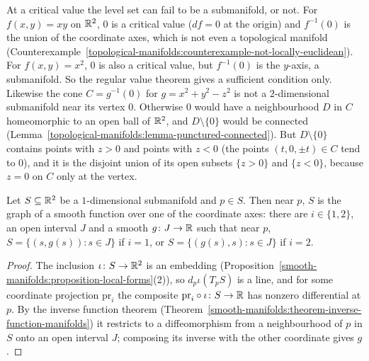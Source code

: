 \begin{counterexample}\label{smooth-manifolds:counterexample-critical-level}
At a critical value the level set can fail to be a submanifold, or not. For $f(x, y) = xy$ on $\mathbb{R}^2$, $0$ is a critical value ($df = 0$ at the origin) and $f^{-1}(0)$ is the union of the coordinate axes, which is not even a
topological manifold (Counterexample~\ref{topological-manifolds:counterexample-not-locally-euclidean}). For $f(x, y) = x^2$, $0$ is also a critical value, but $f^{-1}(0)$ is the $y$-axis, a submanifold. So the regular value
theorem gives a sufficient condition only. Likewise the cone $C = g^{-1}(0)$ for $g = x^2 + y^2 - z^2$ is not a $2$-dimensional submanifold near its vertex
$0$. Otherwise $0$ would have a neighbourhood $D$ in $C$ homeomorphic to an open ball of $\mathbb{R}^2$, and $D \setminus \{0\}$ would be connected
(Lemma~\ref{topological-manifolds:lemma-punctured-connected}). But $D \setminus \{0\}$ contains points with $z > 0$ and points with $z < 0$ (the points
$(t, 0, \pm t) \in C$ tend to $0$), and it is the disjoint union of its open subsets $\{z > 0\}$ and $\{z < 0\}$, because $z = 0$ on $C$ only at the vertex.
\end{counterexample}

\begin{lemma}\label{smooth-manifolds:lemma-curve-graph}
Let $S \subseteq \mathbb{R}^2$ be a $1$-dimensional submanifold and $p \in S$. Then near $p$, $S$ is the graph of a smooth function over one of the coordinate axes: there are $i \in \{1, 2\}$, an open interval $J$ and a smooth
$g \colon J \to \mathbb{R}$ such that near $p$, $S = \{(s, g(s)) : s \in J\}$ if $i = 1$, or $S = \{(g(s), s) : s \in J\}$ if $i = 2$.
\end{lemma}

\begin{proof}
The inclusion $\iota \colon S \to \mathbb{R}^2$ is an embedding (Proposition~\ref{smooth-manifolds:proposition-local-forms}(2)), so $d_p\iota(T_pS)$ is a line, and for some coordinate projection $\mathrm{pr}_i$ the composite
$\mathrm{pr}_i \circ \iota \colon S \to \mathbb{R}$ has nonzero differential at $p$. By the inverse function theorem (Theorem~\ref{smooth-manifolds:theorem-inverse-function-manifolds}) it restricts to a diffeomorphism from a
neighbourhood of $p$ in $S$ onto an open interval $J$; composing its inverse with the other coordinate gives $g$.
\end{proof}

